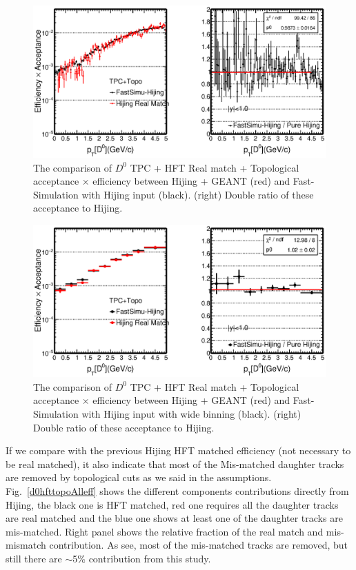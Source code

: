 \documentclass[a4paper]{article}
\begin{document}
\begin{figure}[htbp]
\centering
\includegraphics[keepaspectratio,width=1.0\textwidth,angle=0]{fig/Real_Physics_FastHijingVsPureHijing_HFTTopo2.eps}
\caption{The comparison of $D^0$ TPC + HFT Real match + Topological acceptance $\times$ efficiency between Hijing + GEANT (red) and Fast-Simulation with Hijing input (black). (right) Double ratio of these acceptance to Hijing.}
\label{d0hfttoporealeff}
\end{figure}

\begin{figure}[htbp]
\centering
\includegraphics[keepaspectratio,width=1.0\textwidth,angle=0]{fig/Real_Physics_FastHijingVsPureHijing_HFTTopo.eps}
\caption{The comparison of $D^0$ TPC + HFT Real match + Topological acceptance $\times$ efficiency between Hijing + GEANT (red) and Fast-Simulation with Hijing input with wide binning (black). (right) Double ratio of these acceptance to Hijing.}
\label{d0hfttoporealeff2}
\end{figure}

If we compare with the previous Hijing HFT matched efficiency (not necessary to be real matched), it also indicate that most of the Mis-matched daughter tracks are removed by topological cuts as we said in the assumptions. Fig.~\ref{d0hfttopoAlleff} shows the different components contributions directly from Hijing, the black one is HFT matched, red one requires all the daughter tracks are real matched and the blue one shows at least one of the daughter tracks are mis-matched. Right panel shows the relative fraction of the real match and mis-mismatch contribution. As see, most of the mis-matched tracks are removed, but still there are $\sim$5\% contribution from this study.
\end{document}
